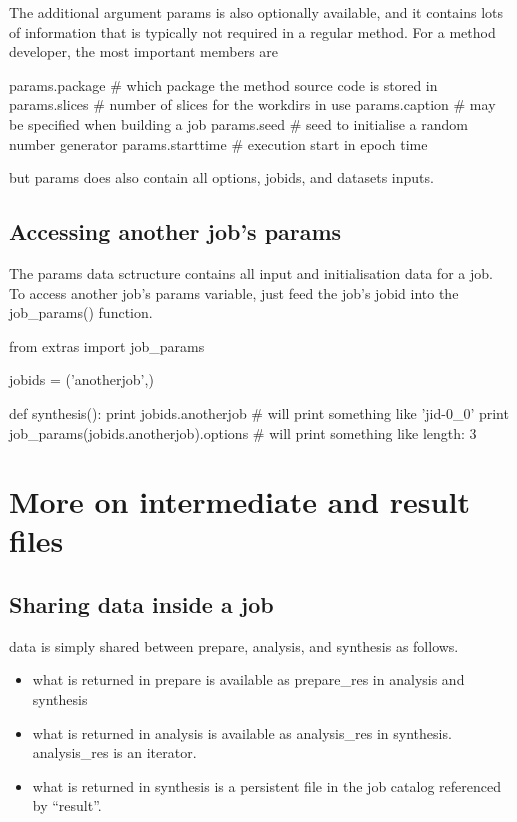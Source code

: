 The additional argument params is also optionally available, and it
contains lots of information that is typically not required in a
regular method.  For a method developer, the most important members
are

\begin{python}
params.package     # which package the method source code is stored in
params.slices      # number of slices for the workdirs in use
params.caption     # may be specified when building a job
params.seed        # seed to initialise a random number generator
params.starttime   # execution start in epoch time
\end{python}
but params does also contain all options, jobids, and datasets inputs.



\subsection{Accessing another job's params}

The params data sctructure contains all input and initialisation data
for a job.  To access another job's params variable, just feed the
job's jobid into the job\_params() function.

\begin{python}
from extras import job_params

jobids = ('anotherjob',)

def synthesis():
  print jobids.anotherjob
  # will print something like 'jid-0_0'
  print job_params(jobids.anotherjob).options
  # will print something like {length: 3}
\end{python}




\newpage
\section{More on intermediate and result files}

\subsection{Sharing data inside a job}
data is simply shared between prepare, analysis, and synthesis as follows.
\begin{itemize}
\item what is returned in prepare is available as prepare\_res in analysis and synthesis
\item what is returned in analysis is available as analysis\_res in synthesis.  analysis\_res is an iterator.
\item what is returned in synthesis is a persistent file in the job catalog referenced by ``result''.
\end{itemize}

